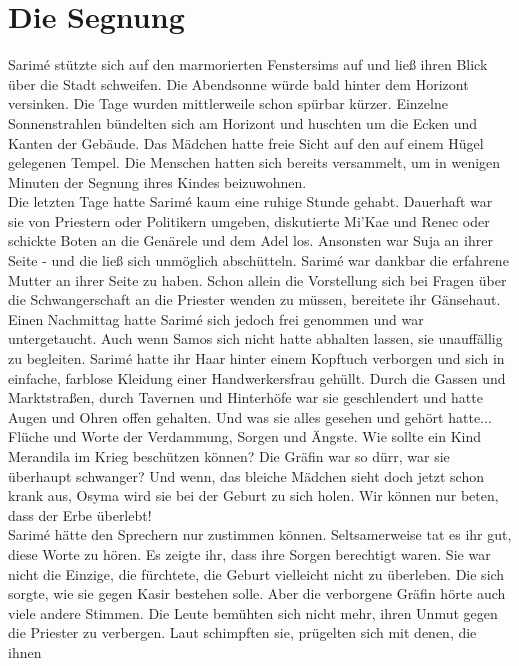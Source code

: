 \chapter{Die Segnung}

Sarimé stützte sich auf den marmorierten Fenstersims auf und ließ ihren Blick über die Stadt 
schweifen. Die Abendsonne würde bald hinter dem Horizont versinken. Die Tage wurden mittlerweile 
schon spürbar kürzer. Einzelne Sonnenstrahlen bündelten sich am Horizont und huschten um die Ecken 
und Kanten der Gebäude. Das Mädchen hatte freie Sicht auf den auf einem Hügel gelegenen Tempel. Die Menschen hatten sich bereits versammelt, um in wenigen Minuten der Segnung ihres Kindes beizuwohnen.\\
Die letzten Tage hatte Sarimé kaum eine ruhige Stunde gehabt. Dauerhaft war sie von Priestern oder 
Politikern umgeben, diskutierte Mi'Kae und Renec oder schickte Boten an die Genärele und dem Adel los. Ansonsten war Suja an ihrer Seite - und die ließ sich unmöglich abschütteln. 
Sarimé war dankbar die erfahrene Mutter an ihrer Seite zu haben. Schon allein die Vorstellung sich 
bei Fragen über die Schwangerschaft an die Priester wenden zu müssen, bereitete ihr Gänsehaut.\\
Einen Nachmittag hatte Sarimé sich jedoch frei genommen und war untergetaucht. Auch wenn Samos sich 
nicht hatte abhalten lassen, sie unauffällig zu begleiten. Sarimé hatte ihr Haar hinter einem 
Kopftuch verborgen und sich in einfache, farblose Kleidung einer Handwerkersfrau gehüllt. Durch die 
Gassen und Marktstraßen, durch Tavernen und Hinterhöfe war sie geschlendert und hatte Augen und 
Ohren offen gehalten. Und was sie alles gesehen und gehört hatte...\\
Flüche und Worte der Verdammung, Sorgen und Ängste. Wie sollte ein Kind Merandila im Krieg 
beschützen können? Die Gräfin war so dürr, war sie überhaupt schwanger? Und wenn, das bleiche 
Mädchen sieht doch jetzt schon krank aus, Osyma wird sie bei der Geburt zu sich holen. Wir können 
nur beten, dass der Erbe überlebt!\\
Sarimé hätte den Sprechern nur zustimmen können. Seltsamerweise tat es ihr gut, diese Worte zu 
hören. Es zeigte ihr, dass ihre Sorgen berechtigt waren. Sie war nicht die Einzige, die fürchtete, 
die Geburt vielleicht nicht zu überleben. Die sich sorgte, wie sie gegen Kasir bestehen solle. Aber 
die verborgene Gräfin hörte auch viele andere Stimmen. Die Leute bemühten sich nicht mehr, ihren 
Unmut gegen die Priester zu verbergen. Laut schimpften sie, prügelten sich mit denen, die ihnen 
